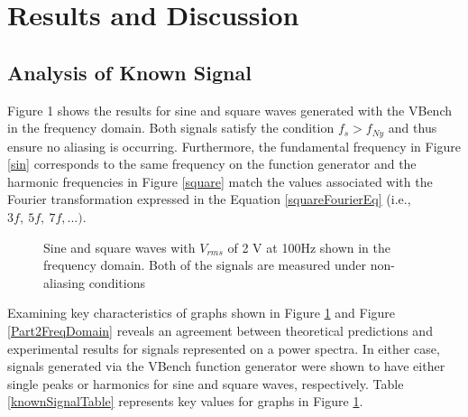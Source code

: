 \documentclass[letterpaper,12pt]{article}
\begin{document}
\section{Results and Discussion} %

\subsection{Analysis of Known Signal} 

Figure 1 shows the results for sine and square waves generated with the VBench in the frequency domain. Both signals satisfy the condition $f_s > f_{Ny}$ and thus ensure no aliasing is occurring. Furthermore, the fundamental frequency in Figure \ref{sin} corresponds to the same frequency on the function generator and the harmonic frequencies in Figure \ref{square} match the values associated with the Fourier transformation expressed in the Equation \ref{squareFourierEq} (i.e., $3f,\ 5f,\ 7f,...)$.  

\begin{figure}[ht]
\centering
{}
\quad
{}
\caption{Sine and square waves with $V_{rms}$ of 2 V at 100Hz shown in the frequency domain. Both of the signals are measured under non-aliasing conditions}
\label{Part1Images}
\end{figure}

Examining key characteristics of graphs shown in Figure \ref{Part1Images} and Figure \ref{Part2FreqDomain} reveals an agreement between theoretical predictions and experimental results for signals represented on a power spectra. In either case, signals generated via the VBench function generator were shown to have either single peaks or harmonics for sine and square waves, respectively. Table \ref{knownSignalTable} represents key values for graphs in Figure \ref{Part1Images}.
\end{document}
